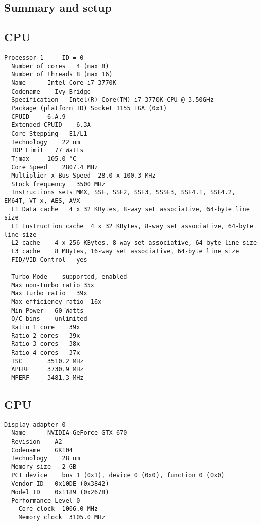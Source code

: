 \documentclass[11pt, oneside, a4paper]{article}
\begin{document}
\clearpage
\begin{appendices}
\section{Summary and setup}

\subsection{CPU} %
\label{sub:cpu}

\begin{verbatim}
Processor 1     ID = 0
  Number of cores   4 (max 8)
  Number of threads 8 (max 16)
  Name      Intel Core i7 3770K
  Codename    Ivy Bridge
  Specification   Intel(R) Core(TM) i7-3770K CPU @ 3.50GHz
  Package (platform ID) Socket 1155 LGA (0x1)
  CPUID     6.A.9
  Extended CPUID    6.3A
  Core Stepping   E1/L1
  Technology    22 nm
  TDP Limit   77 Watts
  Tjmax     105.0 °C
  Core Speed    2807.4 MHz
  Multiplier x Bus Speed  28.0 x 100.3 MHz
  Stock frequency   3500 MHz
  Instructions sets MMX, SSE, SSE2, SSE3, SSSE3, SSE4.1, SSE4.2, EM64T, VT-x, AES, AVX
  L1 Data cache   4 x 32 KBytes, 8-way set associative, 64-byte line size
  L1 Instruction cache  4 x 32 KBytes, 8-way set associative, 64-byte line size
  L2 cache    4 x 256 KBytes, 8-way set associative, 64-byte line size
  L3 cache    8 MBytes, 16-way set associative, 64-byte line size
  FID/VID Control   yes

  Turbo Mode    supported, enabled
  Max non-turbo ratio 35x
  Max turbo ratio   39x
  Max efficiency ratio  16x
  Min Power   60 Watts
  O/C bins    unlimited
  Ratio 1 core    39x
  Ratio 2 cores   39x
  Ratio 3 cores   38x
  Ratio 4 cores   37x
  TSC       3510.2 MHz
  APERF     3730.9 MHz
  MPERF     3481.3 MHz
\end{verbatim}

\clearpage

\subsection{GPU} %
\label{sub:gpu}
\begin{verbatim}
Display adapter 0 
  Name      NVIDIA GeForce GTX 670
  Revision    A2
  Codename    GK104
  Technology    28 nm
  Memory size   2 GB
  PCI device    bus 1 (0x1), device 0 (0x0), function 0 (0x0)
  Vendor ID   0x10DE (0x3842)
  Model ID    0x1189 (0x2678)
  Performance Level 0
    Core clock  1006.0 MHz
    Memory clock  3105.0 MHz


\end{verbatim}
\end{appendices}
\end{document}
